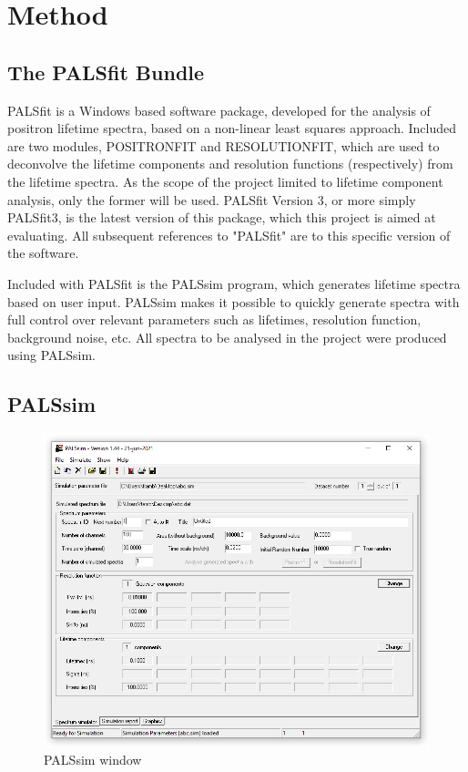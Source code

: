 \chapter{Method}

\section{The PALSfit Bundle}

PALSfit is a Windows based software package, developed for the analysis of positron lifetime spectra, based on a non-linear least squares approach. Included are two modules, POSITRONFIT and RESOLUTIONFIT, which are used to deconvolve the lifetime components and resolution functions (respectively) from the lifetime spectra. As the scope of the project limited to lifetime component analysis, only the former will be used. PALSfit Version 3, or more simply PALSfit3, is the latest version of this package, which this project is aimed at evaluating. All subsequent references to "PALSfit" are to this specific version of the software.

Included with PALSfit is the PALSsim program, which generates lifetime spectra based on user input. PALSsim makes it possible to quickly generate spectra with full control over relevant parameters such as lifetimes, resolution function, background noise, etc. All spectra to be analysed in the project were produced using PALSsim.

\section{PALSsim}
\begin{figure}
    \centering
    \includegraphics[width=0.8\linewidth]{PALSsim.PNG}
    \caption{PALSsim window}
    \label{fig:Psim}
\end{figure}

